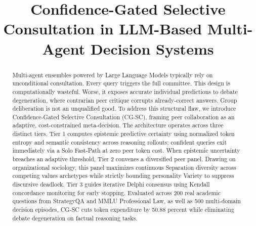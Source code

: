 \documentclass[conference]{IEEEtran}
\begin{document}
\title{Confidence-Gated Selective Consultation in LLM-Based Multi-Agent Decision Systems}

\author{
\and
{}
\and
{}
}

\maketitle

\begin{abstract}
Multi-agent ensembles powered by Large Language Models typically rely on unconditional consultation. Every query triggers the full committee. This design is computationally wasteful. Worse, it exposes accurate individual predictions to debate degeneration, where contrarian peer critique corrupts already-correct answers. Group deliberation is not an unqualified good. To address this structural flaw, we introduce Confidence-Gated Selective Consultation (CG-SC), framing peer collaboration as an adaptive, cost-constrained meta-decision. The architecture operates across three distinct tiers. Tier 1 computes epistemic predictive certainty using normalized token entropy and semantic consistency across reasoning rollouts; confident queries exit immediately via a Solo Fast-Path at zero peer token cost. When epistemic uncertainty breaches an adaptive threshold, Tier 2 convenes a diversified peer panel. Drawing on organizational sociology, this panel maximizes continuous Separation diversity across competing values archetypes while strictly bounding personality Variety to suppress discursive deadlock. Tier 3 guides iterative Delphi consensus using Kendall concordance monitoring for early stopping. Evaluated across 200 real academic questions from StrategyQA and MMLU Professional Law, as well as 500 multi-domain decision episodes, CG-SC cuts token expenditure by 50.88 percent while eliminating debate degeneration on factual reasoning tasks.
\end{abstract}
\end{document}
